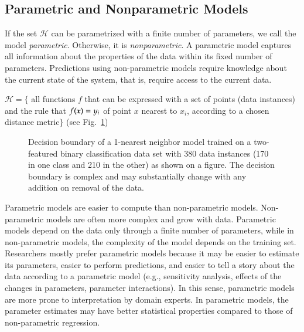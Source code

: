\begin{refsection}
\subsection*{Parametric and Nonparametric Models}

If the set $\mathcal{H}$ can be parametrized with a finite number of parameters, we call the model {\em parametric}. Otherwise, it is {\em nonparametric}. A parametric model captures all information about the properties of the data within its fixed number of parameters. Predictions using non-parametric models require knowledge about the current state of the system, that is, require access to the current data.

\begin{example}
$\mathcal{H} = \lbrace$ all functions $f$ that can be expressed with a set of points (data instances) and the rule that $f(\boldsymbol{x}) = y_i$ of point $x$ nearest to $x_i$, according to a chosen distance metric$\rbrace$ (see Fig.~\ref{fig:1-nn})
\end{example}

\begin{figure}[htbp]
\caption{Decision boundary of a 1-nearest neighbor model trained on a two-featured binary classification data set with 380 data instances (170 in one class and 210 in the other) as shown on a figure. The decision boundary is complex and may substantially change with any addition on removal of the data.}
\label{fig:1-nn}
\end{figure}

Parametric models are easier to compute than non-parametric models. Non-parametric models are often more complex and grow with data. Parametric models depend on the data only through a finite number of parameters, while in non-parametric models, the complexity of the model depends on the training set. Researchers mostly prefer parametric models because it may be easier to estimate its parameters, easier to perform predictions, and easier to tell a story about the data according to a parametric model (e.g., sensitivity analysis, effects of the changes in parameters, parameter interactions). In this sense, parametric models are more prone to interpretation by domain experts. In parametric models, the parameter estimates may have better statistical properties compared to those of non-parametric regression.


\end{refsection}
